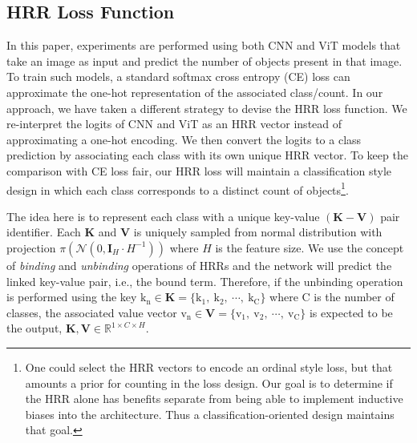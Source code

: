 \documentclass[letterpaper]{article} %
\begin{document}
\subsection{HRR Loss Function}
In this paper, experiments are performed using both CNN and ViT models that take an image as input and predict the number of objects present in that image. To train such models, a standard softmax cross entropy (CE) loss can approximate the one-hot representation of the associated class/count. In our approach, we have taken a different strategy to devise the HRR loss function. We re-interpret the logits of CNN and ViT as an HRR vector instead of approximating a one-hot encoding. We then convert the logits to a class prediction by associating each class with its own unique HRR vector. To keep the comparison with CE loss fair, our HRR loss will maintain a classification style design in which each class corresponds to a distinct count of objects\footnote{One could select the HRR vectors to encode an ordinal style loss, but that amounts a prior for counting in the loss design. Our goal is to determine if the HRR alone has benefits separate from being able to implement inductive biases into the architecture. Thus a classification-oriented design maintains that goal.}. 
\par 
The idea here is to represent each class with a unique key-value $(\mathbf{K}-\mathbf{V})$ pair identifier. Each $\mathbf{K}$ and $\mathbf{V}$ is uniquely sampled from normal distribution with projection $\pi(\mathcal{N}(0, \mathbf{I}_H \cdot H^{-1}))$ where $H$ is the feature size. We use the concept of \emph{binding} and \emph{unbinding} operations of HRRs and the network will predict the linked key-value pair, i.e., the bound term. Therefore, if the unbinding operation is performed using the key $\mathrm{k}_\mathrm{n} \in \mathbf{K} = \{\mathrm{k}_1,~\mathrm{k}_2,~\cdots,~\mathrm{k}_\mathrm{C}\}$ where $\mathrm{C}$ is the number of classes, the associated value vector $\mathrm{v}_\mathrm{n} \in \mathbf{V} = \{\mathrm{v}_1,~\mathrm{v}_2,~\cdots,~\mathrm{v}_\mathrm{C}\}$ is expected to be the output,
$\mathbf{K}, \mathbf{V} \in \mathbb{R}^{1 \times C \times H}$.
\end{document}

